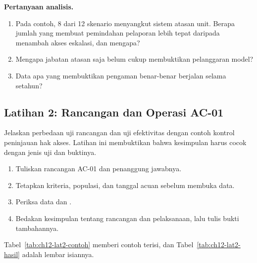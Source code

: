 \textbf{Pertanyaan analisis.}
\begin{enumerate}
  \item Pada contoh, 8 dari 12 skenario menyangkut sistem atasan unit. Berapa jumlah yang membuat
  pemindahan pelaporan lebih tepat daripada menambah akses eskalasi, dan mengapa?
  \item Mengapa jabatan atasan saja belum cukup membuktikan pelanggaran model?
  \item Data apa yang membuktikan pengaman benar-benar berjalan selama setahun?
\end{enumerate}

\subsection*{Latihan 2: Rancangan dan Operasi AC-01}

Jelaskan perbedaan uji rancangan dan uji efektivitas dengan contoh kontrol peninjauan hak akses.
Latihan ini membuktikan bahwa kesimpulan harus cocok dengan jenis uji dan buktinya.
\begin{enumerate}
  \item Tuliskan rancangan AC-01 dan penanggung jawabnya.
  \item Tetapkan kriteria, populasi, dan tanggal acuan sebelum membuka data.
  \item Periksa data  dan
  .
  \item Bedakan kesimpulan tentang rancangan dan pelaksanaan, lalu tulis bukti tambahannya.
\end{enumerate}

Tabel~\ref{tab:ch12-lat2-contoh} memberi contoh terisi, dan Tabel~\ref{tab:ch12-lat2-hasil} adalah
lembar isiannya.

